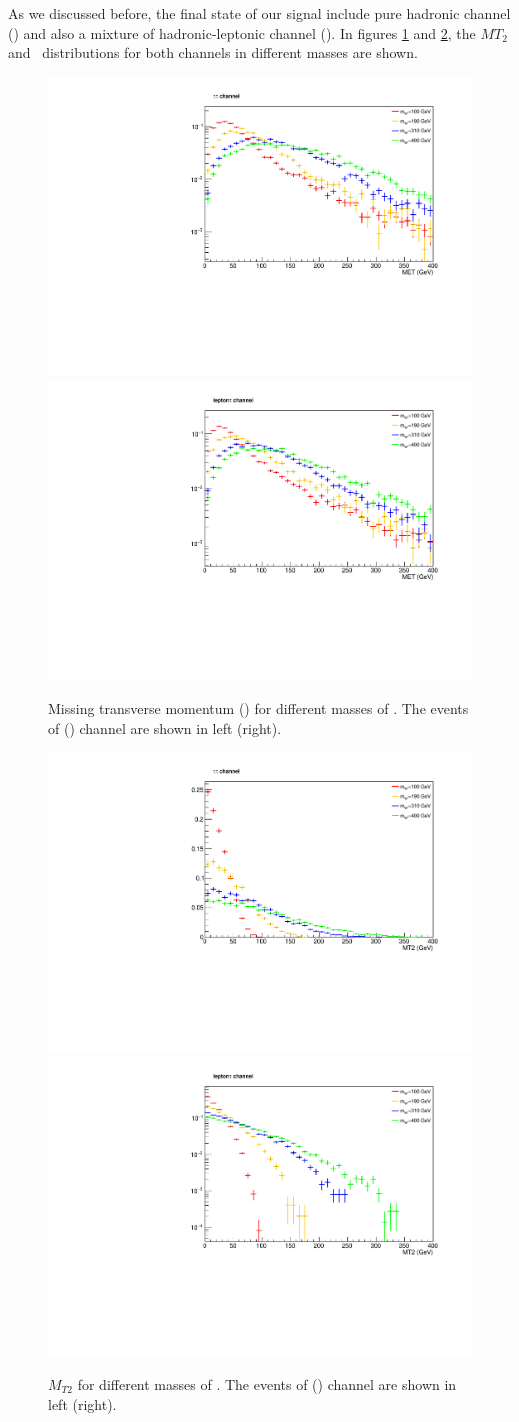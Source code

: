 As we discussed before, the final state of our signal include pure hadronic channel (\tauTau) and also a mixture of hadronic-leptonic channel (\lepTau ).  In figures \ref{fig:met} and \ref{fig:mt2}, the $MT_2$ and \MET  ~distributions for both channels in different \wprime masses are shown.
\begin{figure}[!htb]
\centering
\includegraphics*[width=.45\textwidth]{figs/MET-hh.pdf}
\hspace{3mm}
\includegraphics*[width=.45\textwidth]{figs/MET-lh.pdf}
\caption{Missing transverse momentum (\MET) for different masses of \wprime. The events of \tauTau(\lepTau) channel are shown in left (right).}
\label{fig:met}
\end{figure}
\begin{figure}[htb]
\centering
\includegraphics*[width=.45\textwidth]{figs/MT2-hh.pdf}
\hspace{3mm}
\includegraphics*[width=.45\textwidth]{figs/MT2-lh.pdf}
\caption{$M_{T2}$ for different masses of \wprime. The events of \tauTau (\lepTau) channel are shown in left (right).}
\label{fig:mt2}
\end{figure} 
